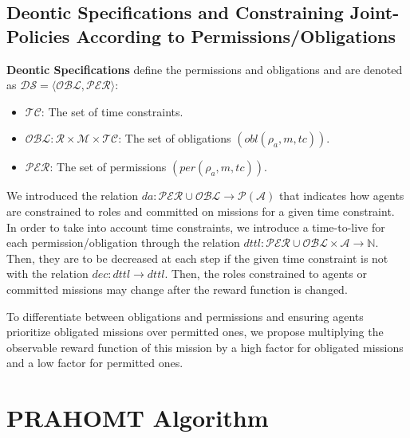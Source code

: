 \documentclass[runningheads]{llncs}
\theoremstyle{freethm}
\theoremstyle{proofoutline}
\newcounter{relation}
\begin{document}
\subsection{Deontic Specifications and Constraining Joint-Policies According to Permissions/Obligations}

\textbf{Deontic Specifications} define the permissions and obligations and are denoted as $\mathcal{DS} = \langle \mathcal{OBL}, \mathcal{PER} \rangle$:

\begin{itemize}
    \item $\mathcal{TC}$: The set of time constraints.
    \item $\mathcal{OBL}: \mathcal{R} \times \mathcal{M} \times \mathcal{TC}$: The set of obligations $(obl(\rho_a, m, tc))$.
    \item $\mathcal{PER}$: The set of permissions $(per(\rho_a, m, tc))$.
\end{itemize}

We introduced the relation $da: \mathcal{PER} \cup \mathcal{OBL} \rightarrow \mathcal{P}(\mathcal{A})$ that indicates how agents are constrained to roles and committed on missions for a given time constraint. In order to take into account time constraints, we introduce a time-to-live for each permission/obligation through the relation $dttl: \mathcal{PER} \cup \mathcal{OBL} \times \mathcal{A} \rightarrow \mathbb{N}$. Then, they are to be decreased at each step if the given time constraint is not  with the relation $dec: dttl \rightarrow dttl$. Then, the roles constrained to agents or committed missions may change after the reward function is changed.

To differentiate between obligations and permissions and ensuring agents prioritize obligated missions over permitted ones, we propose multiplying the observable reward function of this mission by a high factor for obligated missions and a low factor for permitted ones.


\section{PRAHOMT Algorithm}\label{sec:prahom_alg}

\end{document}
